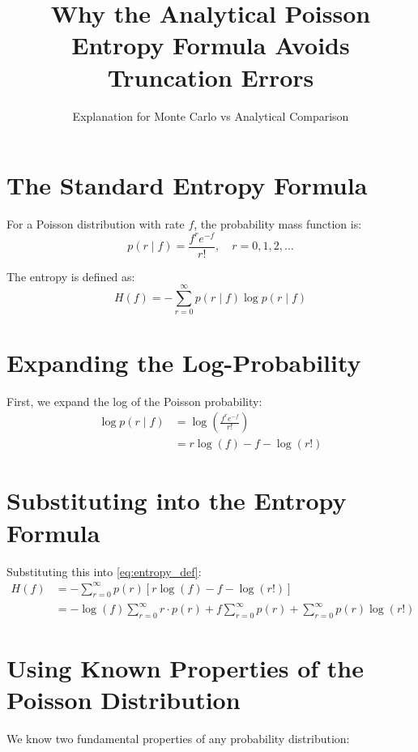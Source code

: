 \documentclass[11pt]{article}
\title{Why the Analytical Poisson Entropy Formula Avoids Truncation Errors}
\author{Explanation for Monte Carlo vs Analytical Comparison}
\date{}
\begin{document}
\maketitle

\section{The Standard Entropy Formula}

For a Poisson distribution with rate $f$, the probability mass function is:
\begin{equation}
p(r \mid f) = \frac{f^r e^{-f}}{r!}, \quad r = 0, 1, 2, \ldots
\end{equation}

The entropy is defined as:
\begin{equation}
H(f) = -\sum_{r=0}^{\infty} p(r \mid f) \log p(r \mid f)
\label{eq:entropy_def}
\end{equation}

\section{Expanding the Log-Probability}

First, we expand the log of the Poisson probability:
\begin{align}
\log p(r \mid f) &= \log\left( \frac{f^r e^{-f}}{r!} \right) \\
&= r \log(f) - f - \log(r!)
\end{align}

\section{Substituting into the Entropy Formula}

Substituting this into \eqref{eq:entropy_def}:
\begin{align}
H(f) &= -\sum_{r=0}^{\infty} p(r) \left[ r \log(f) - f - \log(r!) \right] \\
&= -\log(f) \sum_{r=0}^{\infty} r \cdot p(r) + f \sum_{r=0}^{\infty} p(r) + \sum_{r=0}^{\infty} p(r) \log(r!)
\label{eq:entropy_expanded}
\end{align}

\section{Using Known Properties of the Poisson Distribution}

We know two fundamental properties of any probability distribution:
\end{document}
